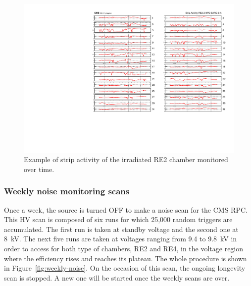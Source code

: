 	\begin{figure}[H]
        \centering
		\includegraphics[width = \linewidth]{fig/chapt5/GIFpp-Strip-Activity.pdf}
		\caption{\label{fig:stripactivity} Example of strip activity of the irradiated RE2 chamber monitored over time.}
	\end{figure}
	
		\subsubsection{Weekly noise monitoring scans}
		\label{chapt5:sssec:noisescan}
		
	Once a week, the source is turned OFF to make a noise scan for the CMS RPC. This HV scan is composed of six runs for which 25,000 random triggers are accumulated. The first run is taken at standby voltage and the second one at \SI{8}{kV}. The next five runs are taken at voltages ranging from 9.4 to \SI{9.8}{kV} in order to access for both type of chambers, RE2 and RE4, in the voltage region where the efficiency rises and reaches its plateau. The whole procedure is shown in Figure~\ref{fig:weekly-noise}. On the occasion of this scan, the ongoing longevity scan is stopped. A new one will be started once the weekly scans are over.
	
